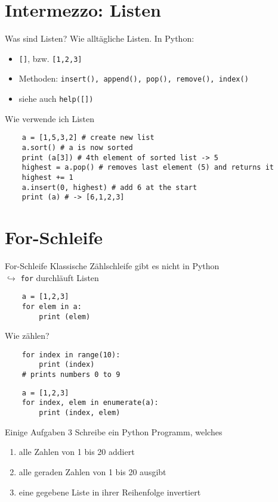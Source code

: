 \section{Intermezzo: Listen}

\begin{frame}{Was sind Listen?}
    Wie alltägliche Listen. In Python:
    \begin{itemize}
        \item \texttt{[]}, bzw. \texttt{[1,2,3]}
        \item Methoden: \texttt{insert(), append(), pop(), remove(), index()}
        \item siehe auch \texttt{help([])}
    \end{itemize}
\end{frame}

\begin{frame}[fragile]{Wie verwende ich Listen}
    \begin{lstlisting}
    a = [1,5,3,2] # create new list
    a.sort() # a is now sorted
    print (a[3]) # 4th element of sorted list -> 5
    highest = a.pop() # removes last element (5) and returns it
    highest += 1
    a.insert(0, highest) # add 6 at the start
    print (a) # -> [6,1,2,3]
    \end{lstlisting}
\end{frame}

\section{For-Schleife}

\begin{frame}[fragile]{For-Schleife}
    Klassische Zählschleife gibt es nicht in Python\\
    $\hookrightarrow$ \texttt{for} durchläuft Listen
    \begin{lstlisting}
    a = [1,2,3]
    for elem in a:
        print (elem)
    \end{lstlisting}
\end{frame}

\begin{frame}[fragile]{Wie zählen?}
    \begin{lstlisting}
    for index in range(10):
        print (index)
    # prints numbers 0 to 9
    \end{lstlisting}
    \begin{lstlisting}
    a = [1,2,3]
    for index, elem in enumerate(a):
        print (index, elem)
    \end{lstlisting}
\end{frame}

\begin{frame}{Einige Aufgaben 3}
	Schreibe ein Python Programm, welches
	\begin{enumerate}
		\item alle Zahlen von 1 bis 20 addiert
		\item alle geraden Zahlen von 1 bis 20 ausgibt
		\item eine gegebene Liste in ihrer Reihenfolge invertiert
	\end{enumerate}
\end{frame}


